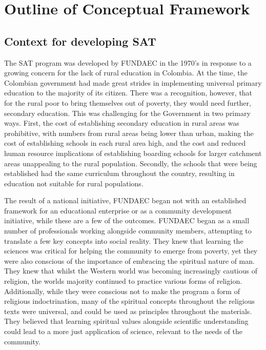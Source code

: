 \section{Outline of Conceptual Framework}
\subsection{Context for developing SAT}
The SAT program was developed by FUNDAEC in the 1970's in response to a growing concern for the lack of rural education in Colombia. At the time, the Colombian government had made great strides in implementing universal primary education to the majority of its citizen. There was a recognition, however, that for the rural poor to bring themselves out of poverty, they would need further, secondary education. This was challenging for the Government in two primary ways. First, the cost of establishing secondary education in rural areas was prohibitive, with numbers from rural areas being lower than urban, making the cost of establishing schools in each rural area high, and the cost and reduced human resource implications of establishing boarding schools for larger catchment areas unappealing to the rural population. Secondly, the schools that were being established had the same curriculum throughout the country, resulting in education not suitable for rural populations. 

The result of a national initiative, FUNDAEC began not with an established framework for an educational enterprise or as a community development initiative, while these are a few of the outcomes. FUNDAEC began as a small number of professionals working alongside community members, attempting to translate a few key concepts into social reality. They knew that learning the sciences was critical for helping the community to emerge from poverty, yet they were also conscious of the importance of embracing the spiritual nature of man. They knew that whilst the Western world was becoming increasingly cautious of religion, the worlds majority continued to practice various forms of religion. Additionally, while they were conscious not to make the program a form of religious indoctrination, many of the spiritual concepts throughout the religious texts were universal, and could be used as principles throughout the materials. They believed that learning spiritual values alongside scientific understanding could lead to a more just application of science, relevant to the needs of the community. 









